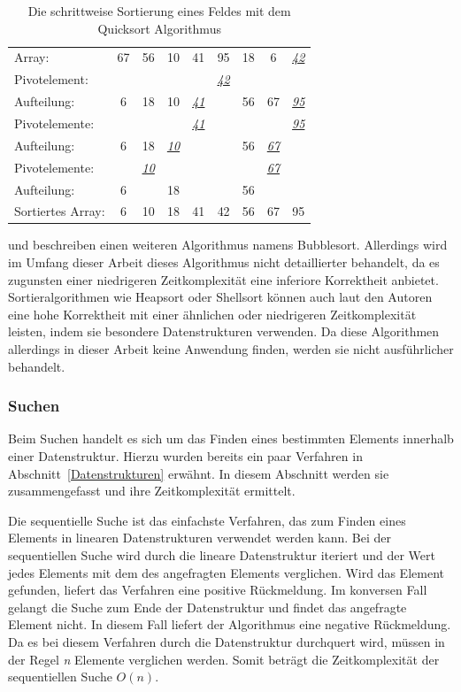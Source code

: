 \begin{table}[b]
	\centering
	\begin{tabular}{l *{8}{c}}
		\hline
		Array: & 67 & 56 & 10 & 41 & 95 & 18 & 6 & \textit{\underline{42}} \\
		Pivotelement: & & & & & \textit{\underline{42}} & & & \\
		Aufteilung: & 6 & 18 & 10 & \textit{\underline{41}} & & 56 & 67 & \textit{\underline{95}} \\
		Pivotelemente: & & & & \textit{\underline{41}} & & & & \textit{\underline{95}} \\
		Aufteilung:  & 6 & 18 & \textit{\underline{10}} & & & 56 & \textit{\underline{67}} & \\
		Pivotelemente: & & \textit{\underline{10}}  & & & & & \textit{\underline{67}} & \\
		Aufteilung: & 6 & & 18 & & & 56 & & \\
		Sortiertes Array: & 6 & 10 & 18 & 41 & 42 & 56 & 67 & 95 \\
		\hline
	\end{tabular}
	\caption[Beispiel eines Sortieralgorithmus]{Die schrittweise Sortierung eines Feldes mit dem Quicksort Algorithmus}
	\label{table: quick_sort}
\end{table} 

\Textcite[213-214]{hubwieser_fundamente_2015} und \textcite[582-585]{ernst_grundkurs_2020} beschreiben einen weiteren Algorithmus namens Bubblesort. Allerdings wird im Umfang dieser Arbeit dieses Algorithmus nicht detaillierter behandelt, da es zugunsten einer niedrigeren Zeitkomplexität eine inferiore Korrektheit anbietet. Sortieralgorithmen wie Heapsort oder Shellsort können auch laut den Autoren eine hohe Korrektheit mit einer ähnlichen oder niedrigeren Zeitkomplexität leisten, indem sie besondere Datenstrukturen verwenden. Da diese Algorithmen allerdings in dieser Arbeit keine Anwendung finden, werden sie nicht ausführlicher behandelt. 

\subsubsection{Suchen}
Beim Suchen handelt es sich um das Finden eines bestimmten Elements innerhalb einer Datenstruktur. Hierzu wurden bereits ein paar Verfahren in Abschnitt~\ref{Datenstrukturen} erwähnt. In diesem Abschnitt werden sie zusammengefasst und ihre Zeitkomplexität ermittelt. 

Die sequentielle Suche ist das einfachste Verfahren, das zum Finden eines Elements in linearen Datenstrukturen verwendet werden kann. Bei der sequentiellen Suche wird durch die lineare Datenstruktur iteriert und der Wert jedes Elements mit dem des angefragten Elements verglichen. Wird das Element gefunden, liefert das Verfahren eine positive Rückmeldung. Im konversen Fall gelangt die Suche zum Ende der Datenstruktur und findet das angefragte Element nicht. In diesem Fall liefert der Algorithmus eine negative Rückmeldung. Da es bei diesem Verfahren durch die Datenstruktur durchquert wird, müssen in der Regel \textit{n} Elemente verglichen werden. Somit beträgt die Zeitkomplexität der sequentiellen Suche $O(n)$. \autocite[224]{hubwieser_fundamente_2015}

